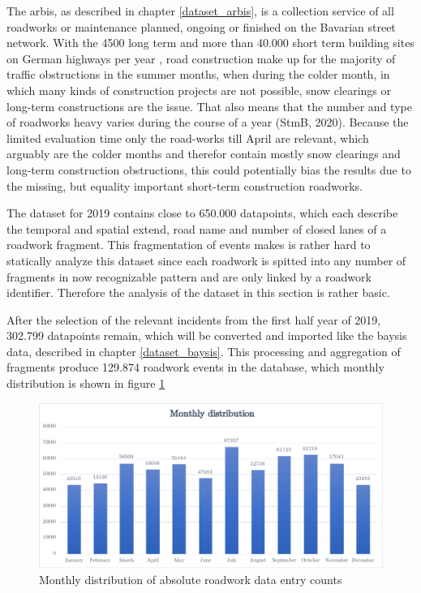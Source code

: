 \documentclass[a4paper,12pt]{report}
\begin{document}
The \acrfull{arbis}, as described in chapter \ref{dataset_arbis}, is a collection service of all roadworks or maintenance planned, ongoing or finished on the Bavarian street network. With the 4500 long term and more than 40.000 short term building sites on German highways per year \cite{LAPID2018,Stmi2020}, road construction make up for the majority of traffic obstructions in the summer months, when during the colder month, in which many kinds of construction projects are not possible, snow clearings or long-term constructions are the issue. That also means that the number and type of roadworks heavy varies during the course of a year (StmB, 2020). Because the limited evaluation time only the road-works till April are relevant, which arguably are the colder months and therefor contain mostly snow clearings and long-term construction obstructions, this could potentially bias the results due to the missing, but equality important short-term construction roadworks.
\par The dataset for 2019 contains close to 650.000 datapoints, which each describe the temporal and spatial extend, road name and number of closed lanes of a roadwork fragment. This fragmentation of events makes is rather hard to statically analyze this dataset since each roadwork is spitted into any number of fragments in now recognizable pattern and are only linked by a roadwork identifier. Therefore the analysis of the dataset in this section is rather basic.
\par After the selection of the relevant incidents from the first half year of 2019, 302.799 datapoints remain, which will be converted and imported like the \acrshort{baysis} data, described in chapter \ref{dataset_baysis}. This processing and aggregation of fragments produce 129.874 roadwork events in the database, which monthly distribution is shown in figure \ref{img:arbis_dataset_monthly_absolute}


\begin{figure}[h]
	\centering
	\includegraphics[scale=0.6]{./assets/arbis_dataset_monthly_absolute}
	\caption{Monthly distribution of absolute roadwork data entry counts}
	\label{img:arbis_dataset_monthly_absolute}
\end{figure}
\end{document}
